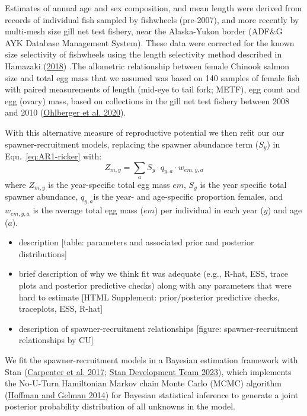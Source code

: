 \documentclass[11pt]{book}
\begin{document}
Estimates of annual age and sex composition, and mean length were derived from records of individual fish sampled by fishwheels (pre-2007), and more recently by multi-mesh size gill net test fishery, near the Alaska-Yukon border (ADF\&G AYK Database Management System). These data were corrected for the known size selectivity of fishwheels using the length selectivity method described in Hamazaki (\protect\hyperlink{ref-Hamazaki2018BorderAgeComp}{2018}) .The allometric relationship between female Chinook salmon size and total egg mass that we assumed was based on 140 samples of female fish with paired measurements of length (mid-eye to tail fork; METF), egg count and egg (ovary) mass, based on collections in the gill net test fishery between 2008 and 2010 (\protect\hyperlink{ref-ohlberger_reproductive_2020}{Ohlberger et al. 2020}).

With this alternative measure of reproductive potential we then refit our our spawner-recruitment models, replacing the spawner abundance term (\(S_{y}\)) in Equ.~\ref{eq:AR1-ricker} with:
\begin{equation} 
  Z_{m,y} = \sum_a S_{y} \cdot q_{y,a} \cdot w_{em,y,a} 
  \label{eq:reprometric}
\end{equation}
where \(Z_{m,y}\) is the year-specific total egg mass \(em\), \(S_{y}\) is the year specific total spawner abundance, \(q_{y,a}\)is the year- and age-specific proportion females, and \(w_{em,y,a}\) is the average total egg mass (\(em\)) per individual in each year (\(y\)) and age (\(a\)).

\hypertarget{model-fitting-and-diagnostics-1}{%
\label{model-fitting-and-diagnostics-1}}
\begin{itemize}

\item
  description {[}table: parameters and associated prior and posterior distributions{]}
\item
  brief description of why we think fit was adequate (e.g., R-hat, ESS, trace plots and posterior predictive checks) along with any parameters that were hard to estimate {[}HTML Supplement: prior/posterior predictive checks, traceplots, ESS, R-hat{]}
\item
  description of spawner-recruitment relationships {[}figure: spawner-recruitment relationships by CU{]}
\end{itemize}
We fit the spawner-recruitment models in a Bayesian estimation framework with Stan (\protect\hyperlink{ref-carpenter_stan_2017}{Carpenter et al. 2017}; \protect\hyperlink{ref-standevelopmentteamRstanInterfaceStan2023}{Stan Development Team 2023}), which implements the No-U-Turn Hamiltonian Markov chain Monte Carlo (MCMC) algorithm (\protect\hyperlink{ref-hoffman2014}{Hoffman and Gelman 2014}) for Bayesian statistical inference to generate a joint posterior probability distribution of all unknowns in the model.
\end{document}
